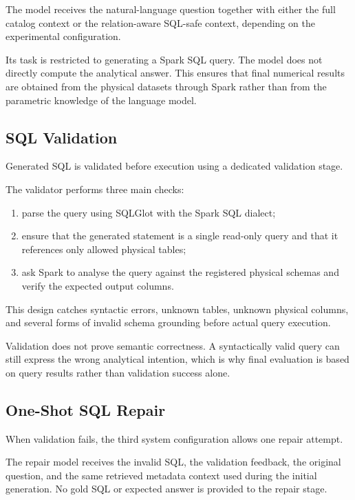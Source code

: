 The model receives the natural-language question together with either the full
catalog context or the relation-aware SQL-safe context, depending on the
experimental configuration.

Its task is restricted to generating a Spark SQL query. The model does not
directly compute the analytical answer. This ensures that final numerical
results are obtained from the physical datasets through Spark rather than from
the parametric knowledge of the language model.


\subsection{SQL Validation}

Generated SQL is validated before execution using a dedicated validation
stage.

The validator performs three main checks:

\begin{enumerate}

    \item parse the query using SQLGlot with the Spark SQL dialect;

    \item ensure that the generated statement is a single read-only query and
    that it references only allowed physical tables;

    \item ask Spark to analyse the query against the registered physical
    schemas and verify the expected output columns.

\end{enumerate}

This design catches syntactic errors, unknown tables, unknown physical
columns, and several forms of invalid schema grounding before actual query
execution.

Validation does not prove semantic correctness. A syntactically valid query
can still express the wrong analytical intention, which is why final
evaluation is based on query results rather than validation success alone.


\subsection{One-Shot SQL Repair}

When validation fails, the third system configuration allows one repair
attempt.

The repair model receives the invalid SQL, the validation feedback, the
original question, and the same retrieved metadata context used during the
initial generation. No gold SQL or expected answer is provided to the repair
stage.

